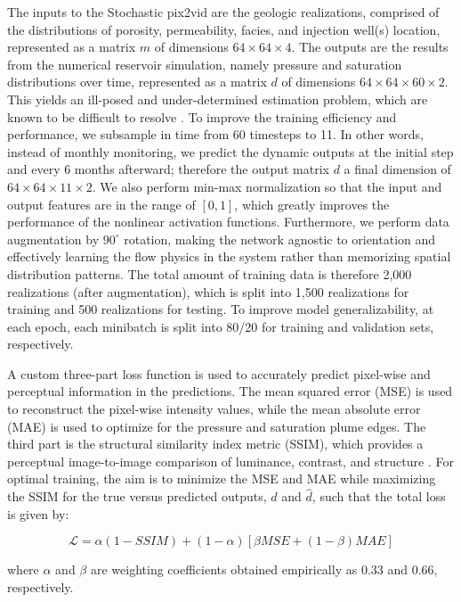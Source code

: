 \documentclass[10pt, twoside]{article}
\begin{document}
The inputs to the Stochastic pix2vid are the geologic realizations, comprised of the distributions of porosity, permeability, facies, and injection well(s) location, represented as a matrix $m$ of dimensions $64\times64\times4$. The outputs are the results from the numerical reservoir simulation, namely pressure and saturation distributions over time, represented as a matrix $d$ of dimensions $64\times64\times60\times2$. This yields an ill-posed and under-determined estimation problem, which are known to be difficult to resolve \cite{tarantola2005inverse, Oliver20081}. To improve the training efficiency and performance, we subsample in time from 60 timesteps to 11. In other words, instead of monthly monitoring, we predict the dynamic outputs at the initial step and every 6 months afterward; therefore the output matrix $d$ a final dimension of $64\times64\times11\times2$. We also perform min-max normalization so that the input and output features are in the range of $[0,1]$, which greatly improves the performance of the nonlinear activation functions. Furthermore, we perform data augmentation by $90^{\circ}$ rotation, making the network agnostic to orientation and effectively learning the flow physics in the system rather than memorizing spatial distribution patterns. The total amount of training data is therefore 2,000 realizations (after augmentation), which is split into 1,500 realizations for training and 500 realizations for testing. To improve model generalizability, at each epoch, each minibatch is split into 80/20 for training and validation sets, respectively. 

A custom three-part loss function is used to accurately predict pixel-wise and perceptual information in the predictions. The mean squared error (MSE) is used to reconstruct the pixel-wise intensity values, while the mean absolute error (MAE) is used to optimize for the pressure and saturation plume edges. The third part is the structural similarity index metric (SSIM), which provides a perceptual image-to-image comparison of luminance, contrast, and structure \cite{Bovik2004}. For optimal training, the aim is to minimize the MSE and MAE while maximizing the SSIM for the true versus predicted outputs, $d$ and $\hat{d}$, such that the total loss is given by:

\begin{equation} \label{eq7}
    \mathcal{L} = \alpha(1-SSIM) + (1-\alpha)[\beta MSE + (1-\beta) MAE]
\end{equation}

where $\alpha$ and $\beta$ are weighting coefficients obtained empirically as 0.33 and 0.66, respectively.
\end{document}
